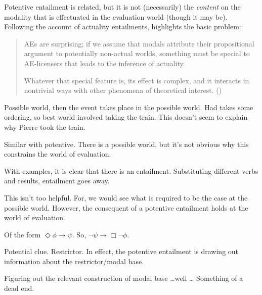 \begin{note}
  Potentive entailment is related, but it is not (necessarily) the \emph{content} on the modality that is effectuated in the evaluation world (though it may be).
  Following the account of actuality entailments, \citeauthor{Alxatib:2019wf} highlights the basic problem:

  \begin{quote}
    AEs are surprising; if we assume that modals attribute their propositional argument to potentially non-actual worlds, something must be special to AE-licensers that leads to the inference of actuality.

    Whatever that special feature is, its effect is complex, and it interacts in nontrivial ways with other phenomena of theoretical interest.\nolinebreak
    \mbox{}\hfill\mbox{(\citeyear[701]{Alxatib:2019wf})}
  \end{quote}

  Possible world, then the event takes place in the possible world.
  Had takes some ordering, so best world involved taking the train.
  This doesn't seem to explain why Pierre took the train.

  Similar with potentive.
  There is a possible world, but it's not obvious why this constrains the world of evaluation.

  With examples, it is clear that there is an entailment.
  Substituting different verbs and results, entailment goes away.

  This isn't too helpful.
  For, we would see what is required to be the case at the possible world.
  However, the consequent of a potentive entailment holds at the world of evaluation.

  Of the form \(\Diamond \phi \rightarrow \psi\).
  So, \(\lnot \psi \rightarrow \Box \lnot \phi\).

  Potential clue.
  Restrictor.
  In effect, the potentive entailment is drawing out information about the restrictor/modal base.

  Figuring out the relevant construction of modal base \dots well \dots
  Something of a dead end.
\end{note}

